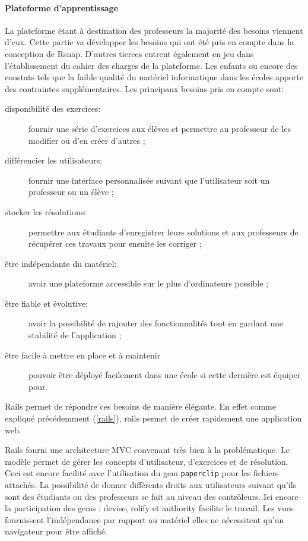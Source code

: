 \paragraph{Plateforme d'apprentissage}
La plateforme étant à destination des professeurs la majorité des besoins viennent d'eux. Cette partie va développer les besoins qui ont été pris en compte dans la conception de Rsnap. D'autres tierces entrent également en jeu dans l'établissement du cahier des charges de la plateforme. Les enfants ou encore des constats tels que la faible qualité du matériel informatique dans les écoles apporte des contraintes supplémentaires. Les principaux besoins pris en compte sont:
\begin{description}
  \item[disponibilité des exercices:] fournir une série d'exercices aux élèves et permettre au professeur de les modifier ou d'en créer d'autres ;
  \item[différencier les utilisateurs:] fournir une interface personnalisée suivant que l'utilisateur soit un professeur ou un élève ;
  \item[stocker les résolutions:] permettre aux étudiants d'enregistrer leurs solutions et aux professeurs de récupérer ces travaux pour ensuite les corriger ;
  \item[être indépendante du matériel:] avoir une plateforme accessible sur le plus d'ordinateurs possible ;
  \item[être fiable et évolutive:] avoir la possibilité de rajouter des fonctionnalités tout en gardant une stabilité de l'application ;
  \item[être facile à mettre en place et à maintenir] pouvoir être déployé facilement dans une école si cette dernière est équiper pour.
\end{description}

Rails permet de répondre ces besoins de manière élégante. En effet comme expliqué précédemment (\ref{rails}), rails permet de créer rapidement une application web.

Rails fourni une architecture MVC convenant très bien à la problématique. Le modèle permet de gérer les concepts d'utilisateur, d'exercices et de résolution. Ceci est encore facilité avec l'utilisation du gem \texttt{paperclip} pour les fichiers attachés.  La possibilité de donner différents droits aux utilisateurs suivant qu'ils sont des étudiants ou des professeurs se fait au niveau des contrôleurs. Ici encore la participation des gems : devise, rolify et authority facilite le travail. Les vues fournissent l'indépendance par rapport au matériel elles ne nécessitent qu'un navigateur pour être affiché.\\

